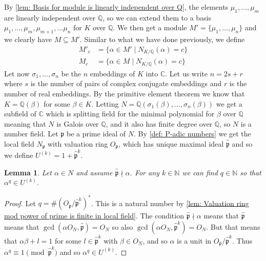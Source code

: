 \documentclass{article}
\newtheorem{lemma}{Lemma}[section]
\newcommand{\mfrak}[1]{\mathfrak{#1}}
\newcommand{\mbb}[1]{\mathbb{#1}}
\numberwithin{equation}{section}
\begin{document}
By \cref{lem: Basis for module is linearly independent over Q}, the elements $\mu_1, ..., \mu_m$ are linearly independent over $\mbb Q$, so we can extend them to a basis $\mu_1, ...,\mu_{m}, \mu_{m+1}, ... \mu_n$ for $K$ over $\mbb Q$. We then get a module $M' = \{ \mu_1, ..., \mu_n\}$ and we clearly have $M \subseteq M'$. Similar to what we have done previously, we define
\begin{align*}
    M'_c & = \{\alpha \in M' \mid N_{K / \mbb Q}(\alpha) = c \} \\
    M_c  & = \{\alpha \in M \mid N_{K / \mbb Q}(\alpha) = c \}
\end{align*}
Let now $\sigma_1, ..., \sigma_n$ be the $n$ embeddings of $K$ into $\mbb C$. Let us write $n = 2s + r$ where $s$ is the number of pairs of complex conjugate embeddings and $r$ is the number of real embeddings. By the primitive element theorem we know that $K = \mbb Q(\beta)$ for some $\beta \in K$. Letting $N = \mbb Q(\sigma_1(\beta), ..., \sigma_n(\beta))$ we get a subfield of $\mbb C$ which is splitting field for the minimal polynomial for $\beta$ over $\mbb Q$ meaning that $N$ is Galois over $\mbb Q$, and it also has finite degree over $\mbb Q$, so $N$ is a number field. Let $\mfrak p$ be a prime ideal of $N$. By \cref{def: P-adic numbers} we get the local field $N_{\mfrak p}$ with valuation ring $O_{\mfrak p}$, which has unique maximal ideal $\hat {\mfrak p}$ and so we define $U^{(k)} = 1 + \hat {\mfrak p}^k$.

\begin{lemma}\label{lem: Elements can be mapped to U^(k)}
    Let $\alpha \in N$ and assume $\hat {\mfrak p} \nmid \alpha$. For any $k \in \mbb N$ we can find $q \in \mbb N$ so that $\alpha^q \in U^{(k)}$.
\end{lemma}

\begin{proof}
    Let $q = \# (O_\mfrak p / \hat {\mfrak p}^k)^*$. This is a natural number by \cref{lem: Valuation ring mod power of prime is finite in local field}. The condition $\hat{\mfrak p}\nmid \alpha$ means that $\hat {\mfrak p}$ means that $\gcd(\alpha O_N, \hat {\mfrak p}) = O_N$ so also $\gcd(\alpha O_N, \hat {\mfrak p}^k) = O_N$. But that means that $\alpha \beta + l = 1$ for some $l \in {\hat {\mfrak p}}^k$ with $\beta \in O_N$, and so $\alpha$ is a unit in $O_\mfrak p / \hat {\mfrak p}^k$. Thus $\alpha^q \equiv 1 \pmod {\hat{\mfrak p}^k}$ and so $\alpha^q \in U^{(k)}$.
\end{proof}
\end{document}
